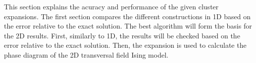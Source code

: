 This section explains the acuracy and performance of the given cluster expansions. The first section compares the different constructions in 1D based on the error relative to the exact solution. The best algorithm will form the basis for the 2D results. First, similarly to 1D, the results will be checked based on the error relative to the exact solution. Then, the expansion is used to calculate the phase diagram of the 2D transversal field Ising model.